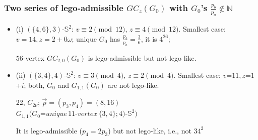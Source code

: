 \documentclass{beamer}
\begin{document}
\begin{frame}\frametitle{Two series of lego-admissible  $GC_z(G_0)$ with $G_0$'s $\frac{p_b}{p_a}\notin \mathbb{N}$}
\begin{itemize}

\item 

(i) $(\{4,6\}, 3)$-$\mathbb{S}^2$: $v\equiv 2 \pmod {12}$, $z\equiv 4 \pmod {12}$.
Smallest case: $v=14, z=2+0 \omega$; unique $G_0$ has  $\frac{p_b}{p_a}=\frac{3}{6}$, it is $4^26$; 

 
$56$-vertex $GC_{2,0}(G_0)$ is lego-admissible but not lego like. 

\item (ii) $(\{3,4\}, 4)$-$\mathbb{S}^2$: $v\equiv 3 \pmod 4$, $z\equiv 2 \pmod 4$.
Smallest case: $v$=$11, z$=$1$+$i$; both,
$G_0$ and $G_{1,1}(G_0)$ are not lego-like.

 \small
 \begin{center}
\begin{minipage}{7.6cm}
\centering
{}\par
22, $C_{2\nu}$; $\vec{p}=(p_3,p_4)=(8,16)$\\
$G_{1,1}(G_0$=$unique\,11$-$vertex\,\{3,4\};4)$-$\mathbb{S}^2)$
\end{minipage}
\end{center}
It is
 lego-admissible ($p_4=2p_3$) but not lego-like, i.e., not $34^2$




\end{itemize}
\end{frame}
\end{document}
